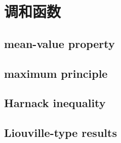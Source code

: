 \section{调和函数}
\label{b2:sec:1301}


\subsection{mean-value property}
\label{b2:subsec:130101}

\subsection{maximum principle}
\label{b2:subsec:130102}

\subsection{Harnack inequality}
\label{b2:subsec:130103}

\subsection{Liouville-type results}
\label{b2:subsec:130104}


